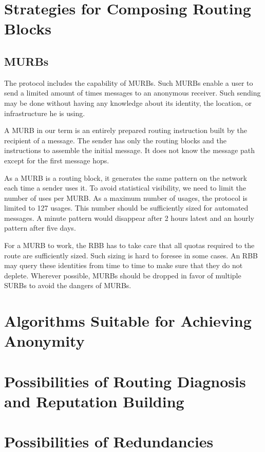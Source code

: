 \section{Strategies for Composing Routing Blocks}

\subsection{MURBs\label{sec:murb}}
The protocol includes the capability of MURBs. Such MURBs enable a user to send a limited amount of times messages to an anonymous receiver. Such sending may be done without having any knowledge about its identity, the location, or infrastructure he is using.

A MURB in our term is an entirely prepared routing instruction built by the recipient of a message. The sender has only the routing blocks and the instructions to assemble the initial message. It does not know the message path except for the first message hops.

As a MURB is a routing block, it generates the same pattern on the network each time a sender uses it. To avoid statistical visibility, we need to limit the number of uses per MURB. As a maximum number of usages, the protocol is limited to 127 usages. This number should be sufficiently sized for automated messages. A minute pattern would disappear after 2 hours latest and an hourly pattern after five days.

For a MURB to work, the RBB has to take care that all quotas required to the route are sufficiently sized. Such sizing is hard to foresee in some cases. An RBB may query these identities from time to time to make sure that they do not deplete. Wherever possible, MURBs should be dropped in favor of multiple SURBs to avoid the dangers of MURBs.

\section{Algorithms Suitable for Achieving Anonymity}
\section{Possibilities of Routing Diagnosis and Reputation Building}
\section{Possibilities of Redundancies}


